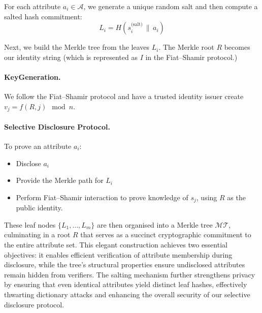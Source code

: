 For each attribute $a_i \in \mathcal{A}$, we generate a unique random salt and then compute a salted hash commitment:
$$L_i = H(s_i^{\text{(salt)}} \,\|\, a_i)$$

Next, we build the Merkle tree from the leaves $L_i$. The Merkle root $R$ becomes our identity string (which is represented as $I$ in the Fiat--Shamir protocol.)

\paragraph{Key\;Generation.}\;We follow the Fiat--Shamir protocol and have a trusted identity issuer create $v_j = f(R, j) \mod n$.

\paragraph{Selective Disclosure Protocol.} To prove an attribute $a_i$:
\begin{itemize}
    \item Disclose $a_i$
    \item Provide the Merkle path for $L_i$
    \item Perform Fiat--Shamir interaction to prove knowledge of $s_j$, using $R$ as the public identity.
\end{itemize}


These leaf nodes $\{L_1, \ldots, L_m\}$ are then organised into a Merkle tree $\mathcal{MT}$, culminating in a root $R$ that serves as a succinct cryptographic commitment to the entire attribute set. This elegant construction achieves two essential objectives: it enables efficient verification of attribute membership during disclosure, while the tree's structural properties ensure undisclosed attributes remain hidden from verifiers. The salting mechanism further strengthens privacy by ensuring that even identical attributes yield distinct leaf hashes, effectively thwarting dictionary attacks and enhancing the overall security of our selective disclosure protocol.


